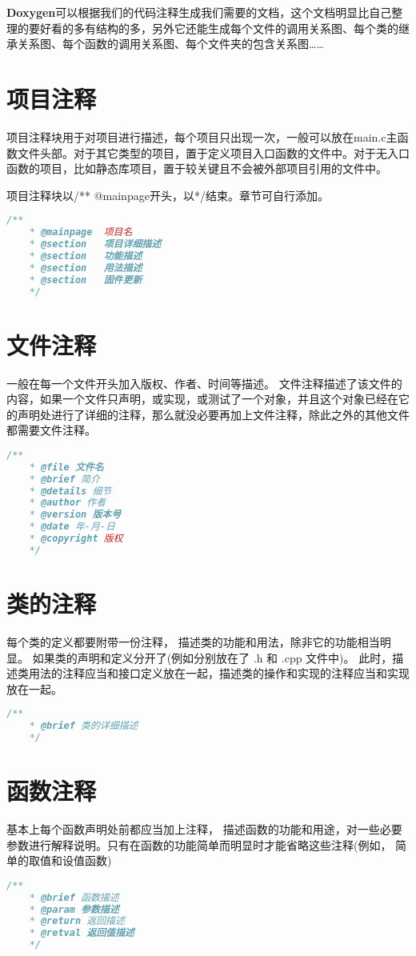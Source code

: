 \pagestyle{fancy}
\rhead{}
\lhead{}
\lfoot{}
\cfoot{-\ \thepage \  -}
\rfoot{}
\textbf{Doxygen}可以根据我们的代码注释生成我们需要的文档，这个文档明显比自己整理的要好看的多有结构的多，另外它还能生成每个文件的调用关系图、每个类的继承关系图、每个函数的调用关系图、每个文件夹的包含关系图……
\section{项目注释}
\qquad 项目注释块用于对项目进行描述，每个项目只出现一次，一般可以放在main.c主函数文件头部。对于其它类型的项目，置于定义项目入口函数的文件中。对于无入口函数的项目，比如静态库项目，置于较关键且不会被外部项目引用的文件中。
\par 项目注释块以/** @mainpage开头，以*/结束。章节可自行添加。
\begin{lstlisting}[language=C++, label=lst:cpp]
	/**
	* @mainpage  项目名
	* @section   项目详细描述
	* @section   功能描述  
	* @section   用法描述 
	* @section   固件更新 
	*/
\end{lstlisting}
\section{文件注释}
\qquad 一般在每一个文件开头加入版权、作者、时间等描述。
文件注释描述了该文件的内容，如果一个文件只声明，或实现，或测试了一个对象，并且这个对象已经在它的声明处进行了详细的注释，那么就没必要再加上文件注释，除此之外的其他文件都需要文件注释。
\begin{lstlisting}[language=C++, label=lst:cpp]
    /**
    * @file 文件名
    * @brief 简介
    * @details 细节
    * @author 作者
    * @version 版本号
    * @date 年-月-日
    * @copyright 版权
    */
\end{lstlisting}
\section{类的注释}
\qquad 每个类的定义都要附带一份注释， 描述类的功能和用法，除非它的功能相当明显。
如果类的声明和定义分开了(例如分别放在了 .h 和 .cpp 文件中)。 此时，描述类用法的注释应当和接口定义放在一起，描述类的操作和实现的注释应当和实现放在一起。
\begin{lstlisting}[language=C++, label=lst:cpp]
    /**
    * @brief 类的详细描述
    */
\end{lstlisting}
\section{函数注释}
\qquad 基本上每个函数声明处前都应当加上注释， 描述函数的功能和用途，对一些必要参数进行解释说明。只有在函数的功能简单而明显时才能省略这些注释(例如， 简单的取值和设值函数)
\begin{lstlisting}[language=C++, label=lst:cpp]
	/**
	* @brief 函数描述
	* @param 参数描述
	* @return 返回描述
	* @retval 返回值描述
	*/
\end{lstlisting}
